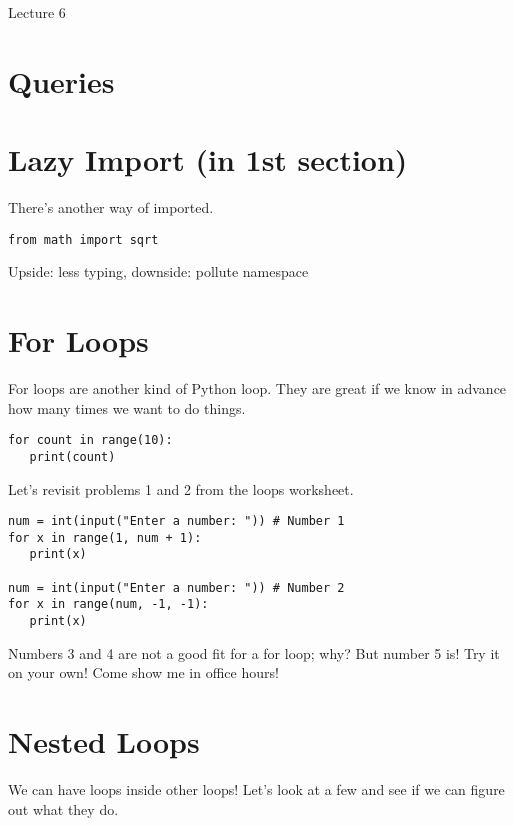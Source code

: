 \documentclass[12pt]{article}
\begin{document}
\begin{center}
   \LARGE Lecture 6
\end{center}

\setcounter{section}{-1}
\section{Queries}

\section*{Lazy Import (in 1st section)}

There's another way of imported.

\begin{lstlisting}
from math import sqrt
\end{lstlisting}

\noindent
Upside: less typing, downside: pollute namespace

\section{For Loops}

For loops are another kind of Python loop.  They are great if we know in
advance how many times we want to do things.

\begin{lstlisting}
for count in range(10):
   print(count)
\end{lstlisting}

\noindent
Let's revisit problems 1 and 2 from the loops worksheet.

\begin{lstlisting}
num = int(input("Enter a number: ")) # Number 1
for x in range(1, num + 1):
   print(x)

num = int(input("Enter a number: ")) # Number 2
for x in range(num, -1, -1):
   print(x)
\end{lstlisting}

\noindent
Numbers 3 and 4 are not a good fit for a for loop; why?  But number 5 is!  Try
it on your own!  Come show me in office hours!

\section{Nested Loops}

We can have loops inside other loops!  Let's look at a few and see if we can
figure out what they do.
\end{document}
